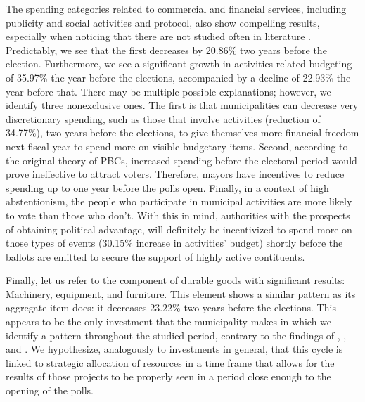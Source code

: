 The spending categories related to commercial and financial services, including publicity and social activities and protocol, also show compelling results, especially when noticing that there are not studied often in literature \parencite{chortareas2016, drazen2010, veiga2007}. Predictably, we see that the first decreases by 20.86\% two years before the election. Furthermore, we see a significant growth in activities-related budgeting of 35.97\% the year before the elections, accompanied by a decline of 22.93\% the year before that. There may be multiple possible explanations; however, we identify three nonexclusive ones. The first is that municipalities can decrease very discretionary spending, such as those that involve activities (reduction of 34.77\%), two years before the elections, to give themselves more financial freedom next fiscal year to spend more on visible budgetary items. Second, according to the original theory of PBCs, increased spending before the electoral period would prove ineffective to attract voters. Therefore, mayors have incentives to reduce spending up to one year before the polls open. Finally, in a context of high abstentionism, the people who participate in municipal activities are more likely to vote than those who don’t. With this in mind, authorities with the prospects of obtaining political advantage, will definitely be incentivized to spend more on those types of events (30.15\% increase in activities’ budget) shortly before the ballots are emitted to secure the support of highly active contituents.  

Finally, let us refer to the component of durable goods with significant results: Machinery, equipment, and furniture. This element shows a similar pattern as its aggregate item does: it decreases 23.22\% two years before the elections. This appears to be the only investment that the municipality makes in which we identify a pattern throughout the studied period, contrary to the findings of \textcite{veiga2007}, \textcite{drazen2010}, and \textcite{chortareas2016}. We hypothesize, analogously to investments in general, that this cycle is linked to strategic allocation of resources in a time frame that allows for the results of those projects to be properly seen in a period close enough to the opening of the polls.
	


